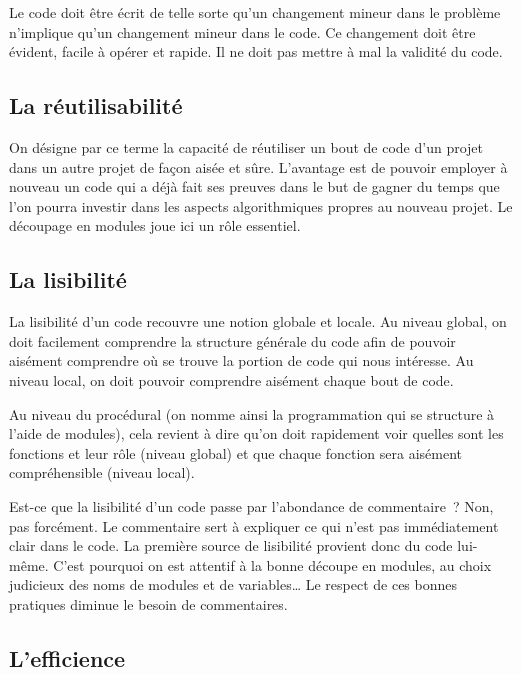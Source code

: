 		Le code doit être écrit de telle sorte qu’un changement
		mineur dans le problème n’implique
		qu’un changement mineur dans le code. 
		Ce changement doit être évident, facile à opérer et rapide. 
		Il ne doit pas mettre à mal la validité du code.
	
	\subsection{La réutilisabilité}
	
		On désigne par ce terme la capacité de réutiliser 
		un bout de code d’un projet dans un autre projet de 
		façon aisée et sûre. L’avantage est de pouvoir employer 
		à nouveau un code qui a déjà fait ses preuves dans le 
		but de gagner du temps que l’on pourra investir dans les 
		aspects algorithmiques propres au nouveau projet. 
		Le découpage en modules joue ici un rôle essentiel.
	
	\subsection{La lisibilité}
	
		La lisibilité d’un code recouvre une notion globale et locale. 
		Au niveau global, on doit facilement comprendre 
		la structure générale du code 
		afin de pouvoir aisément comprendre 
		où se trouve la portion de code qui nous intéresse. 
		Au niveau local, on doit pouvoir comprendre
		aisément chaque bout de code.
	
		Au niveau du procédural (on nomme ainsi la programmation qui se
		structure à l’aide de modules), cela revient à dire
		qu’on doit rapidement voir quelles sont les fonctions et
		leur rôle (niveau global) et que chaque fonction sera aisément
		compréhensible (niveau local).
		
		Est-ce que la lisibilité d’un code passe par
		l’abondance de commentaire~? 
		Non, pas forcément. 
		Le commentaire sert à expliquer 
		ce qui n’est pas immédiatement clair dans le code. 
		La première source de lisibilité provient donc du code lui-même. 
		C’est pourquoi on est attentif à la bonne découpe en modules, 
		au choix judicieux des noms de modules et de variables\dots{}
		Le respect de ces bonnes pratiques 
		diminue le besoin de commentaires.
		
	\subsection{L’efficience}
	
